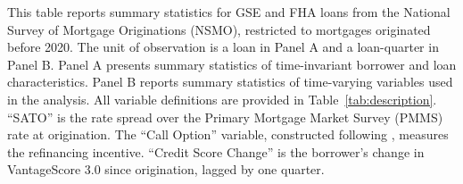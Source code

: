 \documentclass[11pt]{article}
\begin{document}
{\begin{table}[!h]
\begin{minipage}{\textwidth}
\small
This table reports summary statistics for GSE and FHA loans from the National Survey of Mortgage Originations (NSMO), restricted to mortgages originated before 2020. The unit of observation is a loan in Panel A and a loan-quarter in Panel B. Panel A presents summary statistics of time-invariant borrower and loan characteristics. Panel B reports summary statistics of time-varying variables used in the analysis. All variable definitions are provided in Table~\ref*{tab:description}. ``SATO'' is the rate spread over the Primary Mortgage Market Survey (PMMS) rate at origination. The ``Call Option'' variable, constructed following \citet{deng2000mortgage}, measures the refinancing incentive. ``Credit Score Change'' is the borrower’s change in VantageScore 3.0 since origination, lagged by one quarter.

\end{minipage}

\vspace{1em}




\end{table}}
\end{document}
